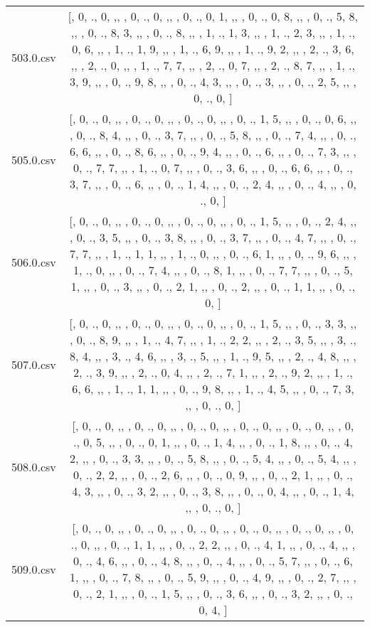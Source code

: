 \begin{table}[ht]
\begin{tabular}{@{}c c@{}}
	503.0.csv & [, 0, ., 0, ,,  , 0, ., 0, ,,  , 0, ., 0, 1, ,,  , 0, ., 0, 8, ,,  , 0, ., 5, 8, ,,  , 0, ., 8, 3, ,,  , 0, ., 8, ,,  , 1, ., 1, 3, ,,  , 1, ., 2, 3, ,,  , 1, ., 0, 6, ,,  , 1, ., 1, 9, ,,  , 1, ., 6, 9, ,,  , 1, ., 9, 2, ,,  , 2, ., 3, 6, ,,  , 2, ., 0, ,,  , 1, ., 7, 7, ,,  , 2, ., 0, 7, ,,  , 2, ., 8, 7, ,,  , 1, ., 3, 9, ,,  , 0, ., 9, 8, ,,  , 0, ., 4, 3, ,,  , 0, ., 3, ,,  , 0, ., 2, 5, ,,  , 0, ., 0, ]\\ 
	505.0.csv & [, 0, ., 0, ,,  , 0, ., 0, ,,  , 0, ., 0, ,,  , 0, ., 1, 5, ,,  , 0, ., 0, 6, ,,  , 0, ., 8, 4, ,,  , 0, ., 3, 7, ,,  , 0, ., 5, 8, ,,  , 0, ., 7, 4, ,,  , 0, ., 6, 6, ,,  , 0, ., 8, 6, ,,  , 0, ., 9, 4, ,,  , 0, ., 6, ,,  , 0, ., 7, 3, ,,  , 0, ., 7, 7, ,,  , 1, ., 0, 7, ,,  , 0, ., 3, 6, ,,  , 0, ., 6, 6, ,,  , 0, ., 3, 7, ,,  , 0, ., 6, ,,  , 0, ., 1, 4, ,,  , 0, ., 2, 4, ,,  , 0, ., 4, ,,  , 0, ., 0, ]\\ 
	506.0.csv & [, 0, ., 0, ,,  , 0, ., 0, ,,  , 0, ., 0, ,,  , 0, ., 1, 5, ,,  , 0, ., 2, 4, ,,  , 0, ., 3, 5, ,,  , 0, ., 3, 8, ,,  , 0, ., 3, 7, ,,  , 0, ., 4, 7, ,,  , 0, ., 7, 7, ,,  , 1, ., 1, 1, ,,  , 1, ., 0, ,,  , 0, ., 6, 1, ,,  , 0, ., 9, 6, ,,  , 1, ., 0, ,,  , 0, ., 7, 4, ,,  , 0, ., 8, 1, ,,  , 0, ., 7, 7, ,,  , 0, ., 5, 1, ,,  , 0, ., 3, ,,  , 0, ., 2, 1, ,,  , 0, ., 2, ,,  , 0, ., 1, 1, ,,  , 0, ., 0, ]\\ 
	507.0.csv & [, 0, ., 0, ,,  , 0, ., 0, ,,  , 0, ., 0, ,,  , 0, ., 1, 5, ,,  , 0, ., 3, 3, ,,  , 0, ., 8, 9, ,,  , 1, ., 4, 7, ,,  , 1, ., 2, 2, ,,  , 2, ., 3, 5, ,,  , 3, ., 8, 4, ,,  , 3, ., 4, 6, ,,  , 3, ., 5, ,,  , 1, ., 9, 5, ,,  , 2, ., 4, 8, ,,  , 2, ., 3, 9, ,,  , 2, ., 0, 4, ,,  , 2, ., 7, 1, ,,  , 2, ., 9, 2, ,,  , 1, ., 6, 6, ,,  , 1, ., 1, 1, ,,  , 0, ., 9, 8, ,,  , 1, ., 4, 5, ,,  , 0, ., 7, 3, ,,  , 0, ., 0, ]\\ 
	508.0.csv & [, 0, ., 0, ,,  , 0, ., 0, ,,  , 0, ., 0, ,,  , 0, ., 0, ,,  , 0, ., 0, ,,  , 0, ., 0, 5, ,,  , 0, ., 0, 1, ,,  , 0, ., 1, 4, ,,  , 0, ., 1, 8, ,,  , 0, ., 4, 2, ,,  , 0, ., 3, 3, ,,  , 0, ., 5, 8, ,,  , 0, ., 5, 4, ,,  , 0, ., 5, 4, ,,  , 0, ., 2, 2, ,,  , 0, ., 2, 6, ,,  , 0, ., 0, 9, ,,  , 0, ., 2, 1, ,,  , 0, ., 4, 3, ,,  , 0, ., 3, 2, ,,  , 0, ., 3, 8, ,,  , 0, ., 0, 4, ,,  , 0, ., 1, 4, ,,  , 0, ., 0, ]\\ 
	509.0.csv & [, 0, ., 0, ,,  , 0, ., 0, ,,  , 0, ., 0, ,,  , 0, ., 0, ,,  , 0, ., 0, ,,  , 0, ., 0, ,,  , 0, ., 1, 1, ,,  , 0, ., 2, 2, ,,  , 0, ., 4, 1, ,,  , 0, ., 4, ,,  , 0, ., 4, 6, ,,  , 0, ., 4, 8, ,,  , 0, ., 4, ,,  , 0, ., 5, 7, ,,  , 0, ., 6, 1, ,,  , 0, ., 7, 8, ,,  , 0, ., 5, 9, ,,  , 0, ., 4, 9, ,,  , 0, ., 2, 7, ,,  , 0, ., 2, 1, ,,  , 0, ., 1, 5, ,,  , 0, ., 3, 6, ,,  , 0, ., 3, 2, ,,  , 0, ., 0, 4, ]\\ 

\end{tabular}
\end{table}
